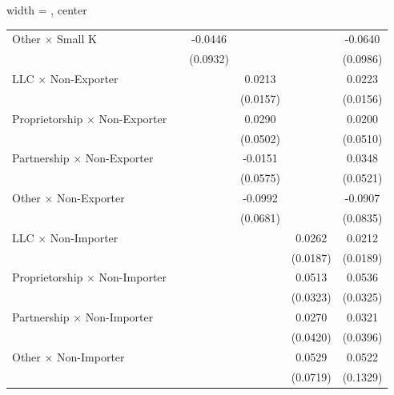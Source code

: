 \begin{adjustbox}{width = \textwidth, center}
\begin{tabular}{lccccc}
      Other $\times$ Small K                &               & -0.0446  &          &          & -0.0640\\   
                                            &               & (0.0932) &          &          & (0.0986)\\   
      LLC $\times$ Non-Exporter             &               &          & 0.0213   &          & 0.0223\\   
                                            &               &          & (0.0157) &          & (0.0156)\\   
      Proprietorship $\times$ Non-Exporter  &               &          & 0.0290   &          & 0.0200\\   
                                            &               &          & (0.0502) &          & (0.0510)\\   
      Partnership $\times$ Non-Exporter     &               &          & -0.0151  &          & 0.0348\\   
                                            &               &          & (0.0575) &          & (0.0521)\\   
      Other $\times$ Non-Exporter           &               &          & -0.0992  &          & -0.0907\\   
                                            &               &          & (0.0681) &          & (0.0835)\\   
      LLC $\times$ Non-Importer             &               &          &          & 0.0262   & 0.0212\\   
                                            &               &          &          & (0.0187) & (0.0189)\\   
      Proprietorship $\times$ Non-Importer  &               &          &          & 0.0513   & 0.0536\\   
                                            &               &          &          & (0.0323) & (0.0325)\\   
      Partnership $\times$ Non-Importer     &               &          &          & 0.0270   & 0.0321\\   
                                            &               &          &          & (0.0420) & (0.0396)\\   
      Other $\times$ Non-Importer           &               &          &          & 0.0529   & 0.0522\\   
                                            &               &          &          & (0.0719) & (0.1329)\\   

\end{tabular}
\end{adjustbox}
